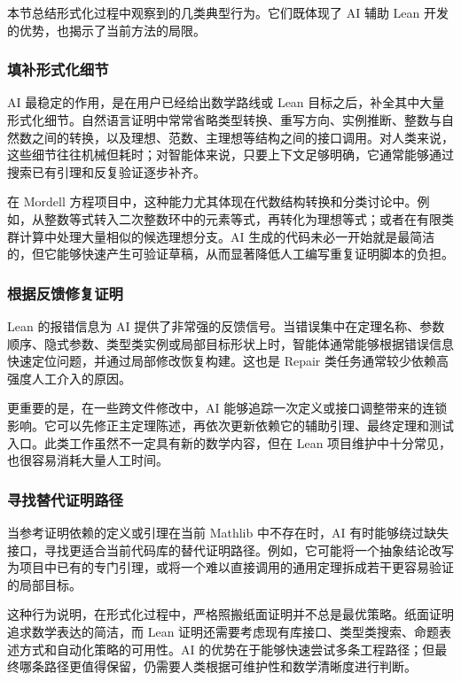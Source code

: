 本节总结形式化过程中观察到的几类典型行为。它们既体现了 AI 辅助 Lean 开发的优势，也揭示了当前方法的局限。

\subsubsection{填补形式化细节}

AI 最稳定的作用，是在用户已经给出数学路线或 Lean 目标之后，补全其中大量形式化细节。自然语言证明中常常省略类型转换、重写方向、实例推断、整数与自然数之间的转换，以及理想、范数、主理想等结构之间的接口调用。对人类来说，这些细节往往机械但耗时；对智能体来说，只要上下文足够明确，它通常能够通过搜索已有引理和反复验证逐步补齐。

在 Mordell 方程项目中，这种能力尤其体现在代数结构转换和分类讨论中。例如，从整数等式转入二次整数环中的元素等式，再转化为理想等式；或者在有限类群计算中处理大量相似的候选理想分支。AI 生成的代码未必一开始就是最简洁的，但它能够快速产生可验证草稿，从而显著降低人工编写重复证明脚本的负担。

\subsubsection{根据反馈修复证明}

Lean 的报错信息为 AI 提供了非常强的反馈信号。当错误集中在定理名称、参数顺序、隐式参数、类型类实例或局部目标形状上时，智能体通常能够根据错误信息快速定位问题，并通过局部修改恢复构建。这也是 Repair 类任务通常较少依赖高强度人工介入的原因。

更重要的是，在一些跨文件修改中，AI 能够追踪一次定义或接口调整带来的连锁影响。它可以先修正主定理陈述，再依次更新依赖它的辅助引理、最终定理和测试入口。此类工作虽然不一定具有新的数学内容，但在 Lean 项目维护中十分常见，也很容易消耗大量人工时间。

\subsubsection{寻找替代证明路径}

当参考证明依赖的定义或引理在当前 Mathlib 中不存在时，AI 有时能够绕过缺失接口，寻找更适合当前代码库的替代证明路径。例如，它可能将一个抽象结论改写为项目中已有的专门引理，或将一个难以直接调用的通用定理拆成若干更容易验证的局部目标。

这种行为说明，在形式化过程中，严格照搬纸面证明并不总是最优策略。纸面证明追求数学表达的简洁，而 Lean 证明还需要考虑现有库接口、类型类搜索、命题表述方式和自动化策略的可用性。AI 的优势在于能够快速尝试多条工程路径；但最终哪条路径更值得保留，仍需要人类根据可维护性和数学清晰度进行判断。

